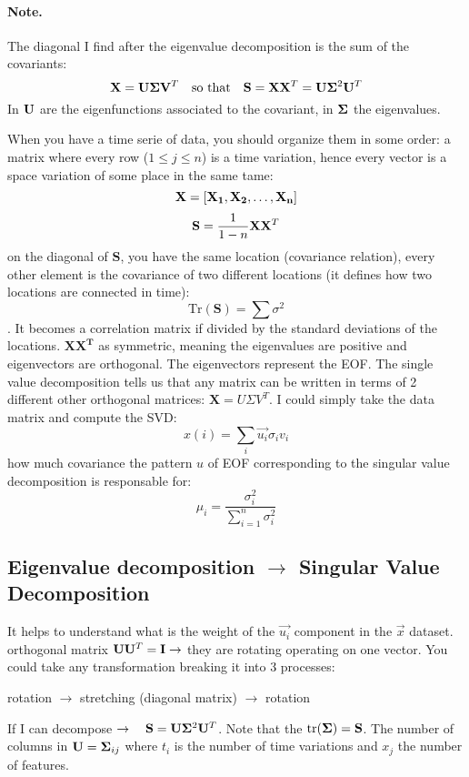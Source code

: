 \paragraph{Note.} The diagonal I find after the eigenvalue decomposition is the sum of the covariants:
\[
	\mathbf{X} = \mathbf{U} \mathbf{\Sigma} \mathbf{V}^T \quad \text{so that} \quad \mathbf{S}=\mathbf{X}\mathbf{X}^T=\mathbf{U} \mathbf{\Sigma}^2 \mathbf{U}^T
\]
In $\mathbf{U}$ are the eigenfunctions associated to the covariant, in $\mathbf{\Sigma}$ the eigenvalues.

When you have a time serie of data, you should organize them in some order: a matrix where every row ($1\leq j\leq n$) is a time variation, hence every vector is a space variation of some place in the same tame:
\[
	\mathbf{X}=\left[\mathbf{X_1, X_2,\dots, X_n} \right]
\]
\[
	\mathbf{S}=\frac{1}
	{1-n}\mathbf{X}\mathbf{X}^T
\]
on the diagonal of $\mathbf{S}$, you have the same location (covariance relation), every other element is the covariance of two different locations (it defines how two locations are connected in time): $$\text{Tr}(\mathbf{S})=\sum\sigma^2$$. It becomes a correlation matrix if divided by the standard deviations of the locations. $\mathbf{XX^T}$ as symmetric, meaning the eigenvalues are positive and eigenvectors are orthogonal. The eigenvectors represent the EOF. The single value decomposition tells us that any matrix can be written in terms of 2 different other orthogonal matrices: $\mathbf{X}=U\Sigma V^T$. I could simply take the data matrix and compute the SVD:
\[x(i)=\sum_i\vec{u_i}\sigma_iv_i\]
how much covariance the pattern $u$ of EOF corresponding to the singular value decomposition  is responsable for:
\[\mu_i=\frac{\sigma_i^2}{\displaystyle\sum_{i=1}^{n}\sigma_i^2}\]

\subsection{Eigenvalue decomposition $\rightarrow$ Singular Value Decomposition}
\label{subsec:svd}
It helps to understand what is the weight of the $\vec{u_i}$ component in the $\vec{x}$ dataset.
\\


orthogonal matrix $\mathbf{U}\mathbf{U}^T= \mathbf{I} \rightarrow$ they are rotating operating on one vector. You could take any transformation breaking it into 3 processes:
\begin{center}
	rotation $\rightarrow$ stretching (diagonal matrix) $\rightarrow$ rotation
\end{center}
If I can decompose $\rightarrow \quad \mathbf{S}=\mathbf{U} \mathbf{\Sigma}^2 \mathbf{U}^T$.
Note that the $\text{tr}(\mathbf{\Sigma})=\mathbf{S}$.
The number of columns in $\mathbf{U}= \mathbf{\Sigma}_{ij}$ where $t_i$ is the number of time variations and $x_j$ the number of features.

